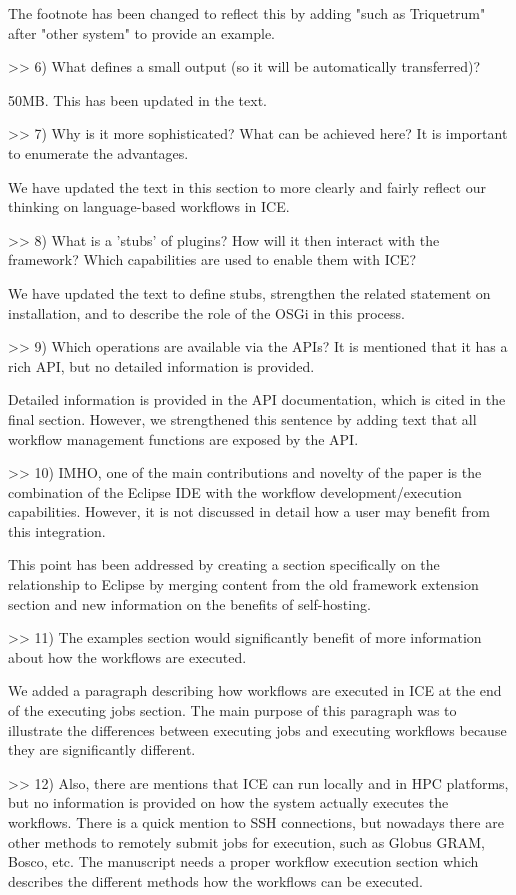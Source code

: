 The footnote has been changed to reflect this by adding "such as Triquetrum" after "other system" to provide an example.

>> 6) What defines a small output (so it will be automatically transferred)?

50MB. This has been updated in the text.

>> 7) Why is it more sophisticated? What can be achieved here? It is important to enumerate the advantages.

We have updated the text in this section to more clearly and fairly reflect our thinking on language-based workflows in ICE.

>> 8) What is a 'stubs' of plugins? How will it then interact with the framework? Which capabilities are used to enable them with ICE?

We have updated the text to define stubs, strengthen the related statement on installation, and to describe the role of the OSGi in this process.

>> 9) Which operations are available via the APIs? It is mentioned that it has a rich API, but no detailed information is provided.

Detailed information is provided in the API documentation, which is cited in the final section. However, we strengthened this sentence by adding text that all workflow management functions are exposed by the API.

>> 10) IMHO, one of the main contributions and novelty of the paper is the combination of the Eclipse IDE with the workflow development/execution capabilities. However, it is not discussed in detail how a user may benefit from this integration.

This point has been addressed by creating a section specifically on the relationship to Eclipse by merging content from the old framework extension section and new information on the benefits of self-hosting.

>> 11) The examples section would significantly benefit of more information about how the workflows are executed.

We added a paragraph describing how workflows are executed in ICE at the end of the executing jobs section. The main purpose of this paragraph was to illustrate the differences between executing jobs and executing workflows because they are significantly different.

>> 12) Also, there are mentions that ICE can run locally and in HPC platforms, but no information is provided on how the system actually executes the workflows. There is a quick mention to SSH connections, but nowadays there are other methods to remotely submit jobs for execution, such as Globus GRAM, Bosco, etc. The manuscript needs a proper workflow execution section which describes the different methods how the workflows can be executed.

